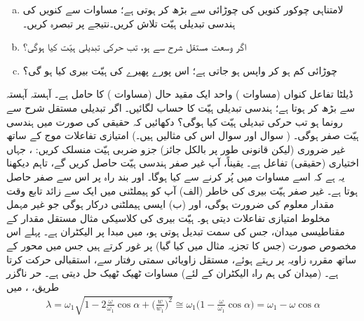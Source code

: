 \begin{enumerate}[a.]
\item
لامتناہی چوکور کنویں کی چوڑائی  سے بڑھ کر  ہوتی ہے؛ مساوات  سے کنویں کی ہندسی تبدیلی ہیّت تلاش کریں۔نتیجے پر تبصرہ کریں۔
\item
اگر وسعت مستقل شرح  سے ہو، تب حرکی تبدیلی ہیّت کیا ہوگی؟ 
\item
چوڑائی کم ہو کر واپس  ہو جاتی ہے؛ اس پورے پھیرے کی ہیّت بیری کیا ہو گی؟ 
\end{enumerate}
ڈیلٹا تفاعل کنواں (مساوات ) واحد ایک مقید حال (مساوات ) کا حامل ہے۔  آہستہ آہستہ  سے بڑھ کر  ہوتا ہے؛ ہندسی تبدیلی ہیّت کا حساب لگائیں۔ اگر تبدیلی مستقل شرح  سے رونما ہو تب حرکی تبدیلی ہیّت کیا ہوگی؟
دکھائیں کہ حقیقی  کی صورت میں ہندسی ہیّت صفر ہوگی۔ ( سوال  اور سوال  اس کی مثالیں ہیں۔) امتیازی تفاعلات موج کے ساتھ غیر ضروری (لیکن قانونی طور پر بالکل جائز) جزو ضربی ہیّت منسلک کریں: ، جہاں  اختیاری (حقیقی) تفاعل ہے۔ یقیناً، آپ غیر صفر ہندسی ہیّت حاصل کریں گے، تاہم دیکھنا یہ ہے کہ اسے مساوات  میں پُر کرنے سے کیا ہوگا۔ اور بند راہ پر اس سے صفر حاصل ہوتا ہے۔  غیر صفر ہیّت بیری کی خاطر (الف) آپ کو ہیملٹنی میں ایک سے زائد تابع وقت مقدار معلوم کی ضرورت ہوگی، اور (ب) ایسی ہیملٹنی درکار ہوگی جو غیر مہمل مخلوط امتیازی تفاعلات دیتی ہو۔ 
ہیّت بیری کی کلاسیکی مثال مستقل مقدار کے مقناطیسی میدان، جس کی سمت تبدیل ہوتی ہو، میں مبدا پر الیکٹران ہے۔ پہلے اس مخصوص صورت (جس کا تجزیہ مثال  میں کیا گیا) پر غور کرتے ہیں جس میں محور  کے ساتھ مقررہ زاویہ  پر رہتے ہوئے، مستقل زاویائی سمتی رفتار  سے،  استقبالی حرکت کرتا ہے۔ (میدان  کی ہم راہ  الیکٹران کے لئے) مساوات  ٹھیک ٹھیک حل دیتی ہے۔ حر ناگزر طریق، ، میں 
\begin{align}
\lambda = \omega_1 \sqrt{1 - 2 \frac{\omega}{\omega_1} \cos \alpha + \big ( \frac{w}{w_1} \big )^2 } \cong \omega_1 \big ( 1 - \frac{\omega}{\omega_1} \cos \alpha \big ) = \omega_1 - \omega \cos \alpha
\end{align}
